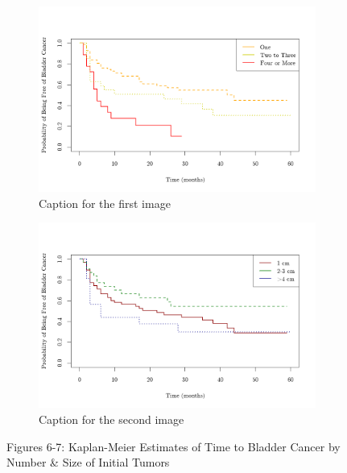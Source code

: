 \documentclass{article}
\begin{document}
	\begin{figure}[htbp]
		\centering
		\captionsetup{labelformat = empty}
		\begin{subfigure}[t]{0.48\textwidth}
		  \includegraphics[width=\linewidth]{graphs/case1/recurrance~tumor_count.png}
		  \caption{Caption for the first image}
		  \label{surv-tumor-count}
		\end{subfigure}
		\hfill
		\begin{subfigure}[t]{0.48\textwidth}
		  \includegraphics[width=\linewidth]{graphs/case1/recurrance~tumor_size.png}
		  \caption{Caption for the second image}
		  \label{surv-tumor-size}
		\end{subfigure}
		\caption{Figures 6-7: Kaplan-Meier Estimates of Time to Bladder Cancer by Number \& Size of Initial Tumors}
		\label{fig-confounders}
	  \end{figure}
	  \addtocounter{figure}{2}
\end{document}
